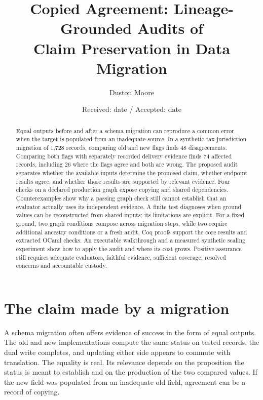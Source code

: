 \documentclass[twocolumn,envcountsect,envcountsame,natbib]{svjour3}
\begin{document}
\title{Copied Agreement: Lineage-Grounded Audits of\\ Claim Preservation in Data Migration}
\author{Duston Moore}
\date{Received: date / Accepted: date}

\maketitle

\begin{abstract}
Equal outputs before and after a schema migration can reproduce a common error when the target is populated from an inadequate source. In a synthetic tax-jurisdiction migration of 1,728 records, comparing old and new flags finds 48 disagreements. Comparing both flags with separately recorded delivery evidence finds 74 affected records, including 26 where the flags agree and both are wrong. The proposed audit separates whether the available inputs determine the promised claim, whether endpoint results agree, and whether those results are supported by relevant evidence. Four checks on a declared production graph expose copying and shared dependencies. Counterexamples show why a passing graph check still cannot establish that an evaluator actually uses its independent evidence. A finite test diagnoses when ground values can be reconstructed from shared inputs; its limitations are explicit. For a fixed ground, two graph conditions compose across migration steps, while two require additional ancestry conditions or a fresh audit. Coq proofs support the core results and extracted OCaml checks. An executable walkthrough and a measured synthetic scaling experiment show how to apply the audit and where its cost grows. Positive assurance still requires adequate evaluators, faithful evidence, sufficient coverage, resolved concerns and accountable custody.
\end{abstract}

\section{The claim made by a migration}\label{ex:sec:intro}
A schema migration often offers evidence of success in the form of equal outputs. The old and new implementations compute the same status on tested records, the dual write completes, and updating either side appears to commute with translation. The equality is real. Its relevance depends on the proposition the status is meant to establish and on the production of the two compared values. If the new field was populated from an inadequate old field, agreement can be a record of copying.
\end{document}
